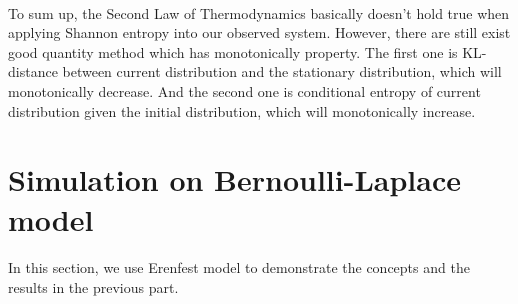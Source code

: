 \documentclass[a4paper, 11pt]{article} %
\begin{document}
\paragraph{}
To sum up, the Second Law of Thermodynamics basically doesn't hold true when applying Shannon entropy into our observed system. However, there are still exist good quantity method which has monotonically property. The first one is KL-distance between current distribution and the stationary distribution, which will monotonically decrease. And the second one is conditional entropy of current distribution given the initial distribution, which will monotonically increase.

\section*{Simulation on Bernoulli-Laplace model}

\paragraph{}
In this section, we use Erenfest model to demonstrate the concepts and the results in the previous part.
\end{document}
